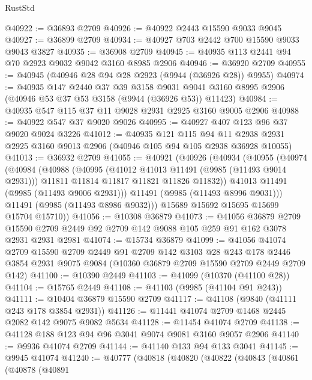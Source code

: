\begin{lexlean}{RustStd}
\begin{coremodule}
@40922 := @36893 @2709
@40926 := @40922 @2443 @15590 @9033 @9045
@40927 := @36899 @2709
@40934 := @40927 @703 @2442 @700 @15590 @9033 @9043 @3827
@40935 := @36908 @2709
@40945 := @40935 @113 @2441 @94 @70 @2923 @9032 @9042 @3160 @8985 @2906
@40946 := @36920 @2709
@40955 := @40945 (@40946 @28 @94 @28 @2923 (@9944 (@36926 @28)) @9955)
@40974 := @40935
    @147
    @2440
    @37
    @39
    @3158
    @9031
    @9041
    @3160
    @8995
    @2906
    (@40946 @53 @37 @53 @3158 (@9944 (@36926 @53)) @11423)
@40984 := @40935 @547 @115 @37 @11 @9028 @2931 @2925 @3160 @9005 @2906
@40988 := @40922 @547 @37 @9020 @9026
@40995 := @40927 @407 @123 @96 @37 @9020 @9024 @3226
@41012 := @40935
    @121
    @115
    @94
    @11
    @2938
    @2931
    @2925
    @3160
    @9013
    @2906
    (@40946 @105 @94 @105 @2938 @36928 @10055)
@41013 := @36932 @2709
@41055 := @40921
    (@40926
      (@40934
        (@40955
          (@40974
            (@40984
              (@40988
                (@40995
                  (@41012 @41013 @11491 (@9985 (@11493 @9014 @2931)))
                  @11811
                  @11814
                  @11817
                  @11821
                  @11826
                  @11832))
              @41013
              @11491
              (@9985 (@11493 @9006 @2931)))
            @11491
            (@9985 (@11493 @8996 @9031)))
          @11491
          (@9985 (@11493 @8986 @9032)))
        @15689
        @15692
        @15695
        @15699
        @15704
        @15710))
@41056 := @10308 @36879
@41073 := @41056
    @36879
    @2709
    @15590
    @2709
    @2449
    @92
    @2709
    @142
    @9088
    @105
    @259
    @91
    @162
    @3078
    @2931
    @2931
    @2981
@41074 := @15734 @36879
@41099 := @41056
    @41074
    @2709
    @15590
    @2709
    @2449
    @91
    @2709
    @142
    @3103
    @28
    @243
    @178
    @2446
    @3854
    @2931
    @9075
    @9084
    (@10360 @36879 @2709 @15590 @2709 @2449 @2709 @142)
@41100 := @10390 @2449
@41103 := @41099 (@10370 (@41100 @28))
@41104 := @15765 @2449
@41108 := @41103 (@9985 (@41104 @91 @243))
@41111 := @10404 @36879 @15590 @2709
@41117 := @41108 (@9840 (@41111 @243 @178 @3854 @2931))
@41126 := @11441 @41074 @2709 @1468 @2445 @2082 @142 @9075 @9082 @5634
@41128 := @11454 @41074 @2709
@41138 := @41128 @188 @123 @94 @96 @3041 @9074 @9081 @3160 @9057 @2906
@41140 := @9936 @41074 @2709
@41144 := @41140 @133 @94 @133 @3041
@41145 := @9945 @41074
@41240 := @40777
    (@40818
      (@40820
        (@40822
          (@40843
            (@40861
              (@40878
                (@40891

\end{coremodule}
\end{lexlean}
